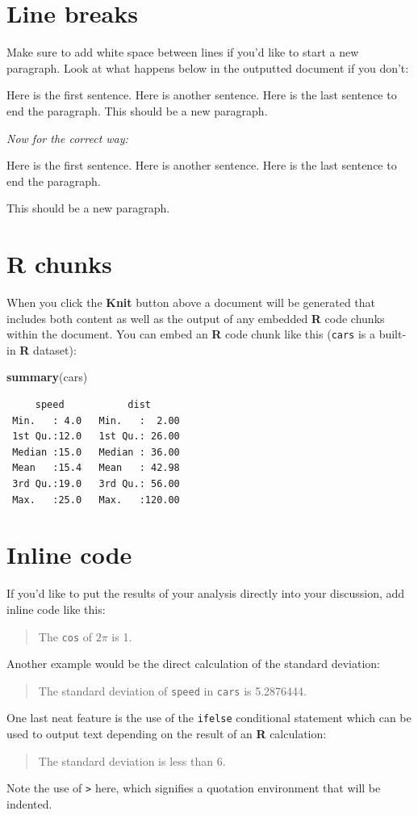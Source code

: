 \documentclass[twoside,12pt,final]{ucthesis-CA2012}
\newenvironment{Shaded}{}{}
\newcommand{\KeywordTok}[1]{\textcolor[rgb]{0.00,0.44,0.13}{\textbf{{#1}}}}
\newcommand{\NormalTok}[1]{{#1}}
\begin{document}
\begin{ucmainmatter}
{\section{Line breaks}\label{line-breaks}}

Make sure to add white space between lines if you'd like to start a new paragraph. Look at what happens below in the outputted document if you don't:

Here is the first sentence. Here is another sentence. Here is the last sentence to end the paragraph.
This should be a new paragraph.

\emph{Now for the correct way:}

Here is the first sentence. Here is another sentence. Here is the last sentence to end the paragraph.

This should be a new paragraph.

\hypertarget{r-chunks}{%
\section{R chunks}\label{r-chunks}}

When you click the \textbf{Knit} button above a document will be generated that includes both content as well as the output of any embedded \textbf{R} code chunks within the document. You can embed an \textbf{R} code chunk like this (\texttt{cars} is a built-in \textbf{R} dataset):
\begin{Shaded}
\begin{Highlighting}[]
\KeywordTok{summary}\NormalTok{(cars)}
\end{Highlighting}
\end{Shaded}
\begin{verbatim}
     speed           dist       
 Min.   : 4.0   Min.   :  2.00  
 1st Qu.:12.0   1st Qu.: 26.00  
 Median :15.0   Median : 36.00  
 Mean   :15.4   Mean   : 42.98  
 3rd Qu.:19.0   3rd Qu.: 56.00  
 Max.   :25.0   Max.   :120.00  
\end{verbatim}
\hypertarget{inline-code}{%
\section{Inline code}\label{inline-code}}

If you'd like to put the results of your analysis directly into your discussion, add inline code like this:
\begin{quote}
The \texttt{cos} of \(2 \pi\) is 1.
\end{quote}
Another example would be the direct calculation of the standard deviation:
\begin{quote}
The standard deviation of \texttt{speed} in \texttt{cars} is 5.2876444.
\end{quote}
One last neat feature is the use of the \texttt{ifelse} conditional statement which can be used to output text depending on the result of an \textbf{R} calculation:
\begin{quote}
The standard deviation is less than 6.
\end{quote}
Note the use of \texttt{\textgreater{}} here, which signifies a quotation environment that will be indented.


\end{ucmainmatter}
\end{document}
